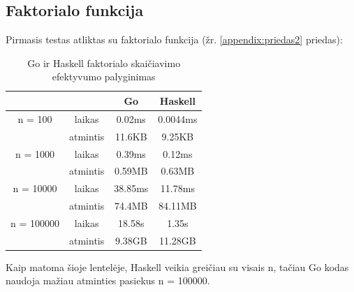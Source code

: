 \documentclass{VUMIFPSbakalaurinis}
\begin{document}
\subsection{Faktorialo funkcija}
Pirmasis testas atliktas su faktorialo funkcija (žr. \ref{appendix:priedas2} priedas): 
\begin{center}
	\centering
	\begin{table}[H]
		\caption{Go ir Haskell faktorialo skaičiavimo efektyvumo palyginimas}
		\centering
	\begin{tabular}{ cccc } 
	& & \textbf{Go} & \textbf{Haskell}  \\
	\midrule
	n = 100 & laikas & 0.02ms & 0.0044ms    \\
	& atmintis & 11.6KB & 9.25KB \\
	\midrule
	n = 1000 & laikas & 0.39ms & 0.12ms  \\
	& atmintis & 0.59MB & 0.63MB \\
	\midrule
	n = 10000 & laikas & 38.85ms & 11.78ms  \\
	& atmintis & 74.4MB & 84.11MB \\
	\midrule
	n = 100000 & laikas & 18.58s & 1.35s  \\
	& atmintis & 9.38GB & 11.28GB \\
	\end{tabular}
	\centering
\end{table}
\end{center}
	Kaip matoma šioje lentelėje, Haskell veikia greičiau su visais n, tačiau Go kodas naudoja mažiau atminties pasiekus n = 100000. 
\end{document}
